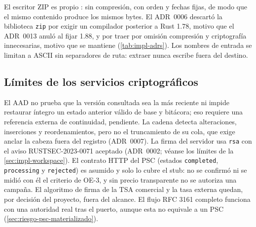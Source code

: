 El escritor ZIP es propio \cite{pkware2022}: sin compresión, con orden y fechas fijas, de modo que el mismo contenido produce los mismos bytes. El ADR~0006 descartó la biblioteca \texttt{zip} por exigir un compilador posterior a Rust 1.78, motivo que el ADR~0013 anuló al fijar 1.88, y por traer por omisión compresión y criptografía innecesarias, motivo que se mantiene (\cref{tab:impl-adrs}). Los nombres de entrada se limitan a ASCII sin separadores de ruta: extraer nunca escribe fuera del destino.





\subsection{Límites de los servicios criptográficos}

El AAD no prueba que la versión consultada sea la más reciente ni impide restaurar íntegro un estado anterior válido de base y bitácora; eso requiere una referencia externa de continuidad, pendiente. La cadena detecta alteraciones, inserciones y reordenamientos, pero no el truncamiento de su cola, que exige anclar la cabeza fuera del registro (ADR~0007). La firma del servidor usa \texttt{rsa} con el aviso RUSTSEC-2023-0071 aceptado (ADR~0002; véanse los límites de la \cref{sec:impl-workspace}). El contrato HTTP del PSC (estados \texttt{completed}, \texttt{processing} y \texttt{rejected}) es asumido y solo lo cubre el stub: no se confirmó ni se midió con él el criterio de OE-3, y sin precio transparente no se autoriza una campaña. El algoritmo de firma de la TSA comercial y la tasa externa quedan, por decisión del proyecto, fuera del alcance. El flujo RFC 3161 completo funciona con una autoridad real tras el puerto, aunque esta no equivale a un PSC (\cref{sec:riesgo-psc-materializado}).


